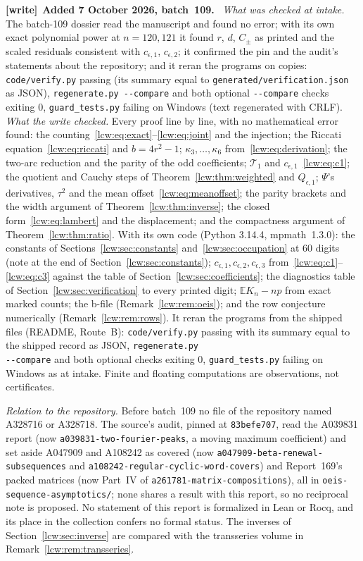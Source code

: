 \documentclass[11pt,letterpaper]{article}
\theoremstyle{remark}\newtheorem{remark}[theorem]{Remark}
\newcommand{\E}{\mathbb E}\newcommand{\Pp}{\mathbb P}
\newcommand{\file}[1]{\nolinkurl{#1}}
\newenvironment{writenote}[1][]{\par\smallskip\begingroup\small
 \noindent\textbf{[write]}\if\relax\detokenize{#1}\relax\else~\textbf{#1.}\fi\ }%
 {\par\endgroup\smallskip}
\begin{document}
\begin{writenote}[Added 7 October 2026, batch~109]
\emph{What was checked at intake.} The batch-109 dossier read the manuscript
and found no error; with its own exact polynomial power at $n=120,121$ it
found $r$, $d$, $C_\pm$ as printed and the scaled residuals consistent with
$c_{\epsilon,1}$, $c_{\epsilon,2}$; it confirmed the pin and the audit's
statements about the repository; and it reran the programs on copies:
\file{code/verify.py} passing (its summary equal to
\file{generated/verification.json} as JSON), \file{regenerate.py --compare}
and both optional \file{--compare} checks exiting 0, \file{guard\_tests.py}
failing on Windows (text regenerated with CRLF). \emph{What the write
checked.} Every proof line by line, with no mathematical error found: the
counting~\eqref{lcw:eq:exact}--\eqref{lcw:eq:joint} and the injection;
the Riccati equation~\eqref{lcw:eq:riccati} and $b=4r^2-1$; $\kappa_3,\dots,\kappa_6$
from~\eqref{lcw:eq:derivation}; the two-arc reduction and the parity of the
odd coefficients; $\mathcal T_1$ and $c_{\epsilon,1}$~\eqref{lcw:eq:c1}; the
quotient and Cauchy steps of Theorem~\ref{lcw:thm:weighted} and $Q_{\epsilon,1}$;
$\Psi$'s derivatives, $\tau^2$ and the mean offset~\eqref{lcw:eq:meanoffset};
the parity brackets and the width argument of Theorem~\ref{lcw:thm:inverse};
the closed form~\eqref{lcw:eq:lambert} and the displacement; and the
compactness argument of Theorem~\ref{lcw:thm:ratio}. With its own code
(Python 3.14.4, mpmath~1.3.0): the constants of Sections~\ref{lcw:sec:constants}
and~\ref{lcw:sec:occupation} at 60 digits (note at the end of
Section~\ref{lcw:sec:constants}); $c_{\epsilon,1},c_{\epsilon,2},c_{\epsilon,3}$
from~\eqref{lcw:eq:c1}--\eqref{lcw:eq:c3} against the table of
Section~\ref{lcw:sec:coefficients}; the diagnostics table of
Section~\ref{lcw:sec:verification} to every printed digit; $\E K_n-np$ from
exact marked counts; the b-file (Remark~\ref{lcw:rem:oeis}); and the row
conjecture numerically (Remark~\ref{lcw:rem:rows}). It reran the programs
from the shipped files (README, Route~B): \file{code/verify.py} passing with
its summary equal to the shipped record as JSON, \file{regenerate.py
--compare} and both optional checks exiting 0, \file{guard\_tests.py}
failing on Windows as at intake. Finite and floating computations are
observations, not certificates.

\emph{Relation to the repository.} Before batch~109 no file of the
repository named A328716 or A328718. The source's audit, pinned at
\file{83befe707}, read the A039831 report (now
\file{a039831-two-fourier-peaks}, a moving maximum coefficient) and set aside
A047909 and A108242 as covered (now \file{a047909-beta-renewal-subsequences}
and \file{a108242-regular-cyclic-word-covers}) and Report~169's packed
matrices (now Part~IV of \file{a261781-matrix-compositions}), all in
\file{oeis-sequence-asymptotics/}; none shares a result with this report, so
no reciprocal note is proposed. No statement of this report is formalized in
Lean or Rocq, and its place in the collection confers no formal status. The
inverses of Section~\ref{lcw:sec:inverse} are compared with the transseries
volume in Remark~\ref{lcw:rem:transseries}.
\end{writenote}
\end{document}

